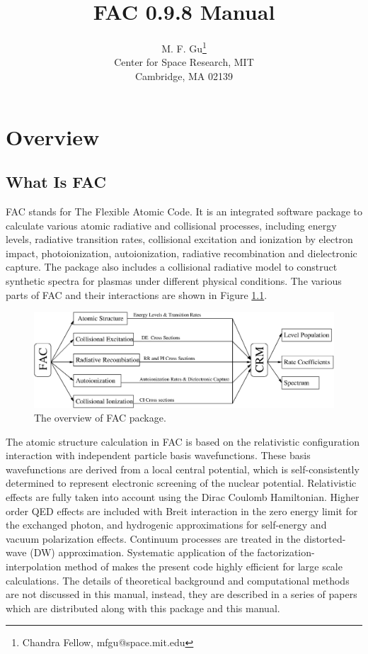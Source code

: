 \documentclass[twoside,letterpaper]{refrep}
\newcommand{\facversion}{{0.9.8}\xspace}
\begin{document}
\title{FAC \facversion Manual}
\author{M. F. Gu\thanks{Chandra Fellow,  mfgu@space.mit.edu} \\
Center for Space Research, MIT \\ Cambridge, MA 02139}

\date{}

\maketitle

\tableofcontents

\chapter{Overview}
\label{cha:overview}

\section{What Is FAC}
FAC stands for The Flexible Atomic Code. It is an
integrated software package to calculate various atomic radiative and
collisional processes, including energy levels, radiative transition rates,
collisional excitation and 
ionization by electron impact, photoionization, autoionization, radiative
recombination and dielectronic capture. The package also includes a
collisional radiative model to construct synthetic spectra for plasmas under
different physical conditions. The various parts of FAC and their
interactions are shown in Figure \ref{fig:flow}. 

\begin{figure}
\includegraphics[width=6in]{flow.eps}
\caption{\label{fig:flow}The overview of FAC package.}
\end{figure}

The atomic structure calculation in FAC is based on the relativistic
configuration interaction with independent particle basis wavefunctions. These
basis wavefunctions are derived from a local central potential, which is
self-consistently determined to represent electronic screening of the nuclear
potential. Relativistic effects are fully taken into account using the Dirac
Coulomb Hamiltonian. Higher order QED effects are included with Breit
interaction in the zero energy limit for the exchanged photon, and hydrogenic
approximations for self-energy and vacuum polarization effects. 
Continuum processes are treated
in the distorted-wave (DW) approximation. Systematic application of the
factorization-interpolation method of \citet{barshalom88} makes the present
code highly efficient for large scale calculations. The details of theoretical
background and computational methods are not discussed in this manual,
instead, they are described in a series of papers which are distributed along
with this package and this manual.
\end{document}
